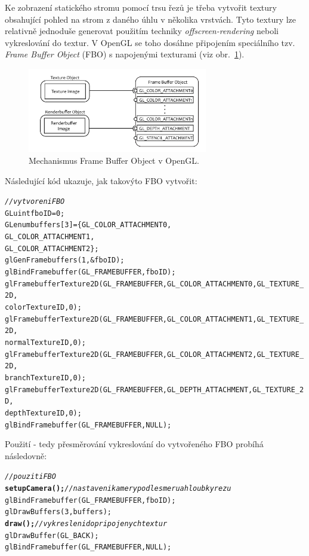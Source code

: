 Ke zobrazení statického stromu pomocí trsu řezů je třeba vytvořit textury obsahující pohled na strom z daného úhlu v několika vrstvách. Tyto textury lze relativně jednoduše generovat použitím techniky \emph{offscreen-rendering} neboli vykreslování do textur. V OpenGL se toho dosáhne připojením speciálního tzv. \emph{Frame Buffer Object} (FBO) s napojenými texturami (viz obr.~\ref{fig:FBO}).
\begin{figure}[!hbt]
\begin{center}
\includegraphics[width=0.7\textwidth]{./figures/FBO.png}
\end{center}
\caption[Mechanismus FBO v OpenGL]%
{Mechanismus Frame Buffer Object v OpenGL.\label{fig:FBO}
}
\end{figure}


 Následující kód ukazuje, jak takovýto FBO vytvořit:
\begin{alltt}
\textit{// vytvoreni FBO}
GLuint	fboID = 0;
GLenum buffers[3] = \{ GL_COLOR_ATTACHMENT0,
                      GL_COLOR_ATTACHMENT1,
                      GL_COLOR_ATTACHMENT2 \};
glGenFramebuffers(1, &fboID);
glBindFramebuffer(GL_FRAMEBUFFER, fboID);
   glFramebufferTexture2D(GL_FRAMEBUFFER, GL_COLOR_ATTACHMENT0, GL_TEXTURE_2D,
                          colorTextureID, 0);
   glFramebufferTexture2D(GL_FRAMEBUFFER, GL_COLOR_ATTACHMENT1, GL_TEXTURE_2D,
                          normalTextureID, 0);
   glFramebufferTexture2D(GL_FRAMEBUFFER, GL_COLOR_ATTACHMENT2, GL_TEXTURE_2D, 
                          branchTextureID, 0);
   glFramebufferTexture2D(GL_FRAMEBUFFER, GL_DEPTH_ATTACHMENT, GL_TEXTURE_2D, 
                          depthTextureID, 0);
glBindFramebuffer(GL_FRAMEBUFFER, NULL);
\end{alltt}
\pagebreak
Použití - tedy přesměrování vykreslování do vytvořeného FBO probíhá následovně:
\begin{alltt}
\textit{// pouziti FBO}
{\bf setupCamera();}      \textit{// nastaveni kamery podle smeru a hloubky rezu}
glBindFramebuffer(GL_FRAMEBUFFER, fboID);
      glDrawBuffers(3, buffers);			
           {\bf draw();}     \textit{// vykresleni do pripojenych textur}
      glDrawBuffer(GL_BACK);
glBindFramebuffer(GL_FRAMEBUFFER, NULL);
\end{alltt}

